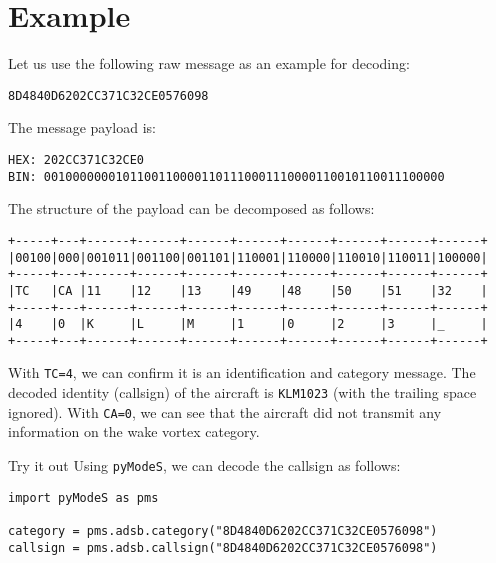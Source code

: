 \section{Example}

Let us use the following raw message as an example for decoding:

\begin{verbatim}
8D4840D6202CC371C32CE0576098
\end{verbatim}

The message payload is:

\begin{verbatim}
HEX: 202CC371C32CE0
BIN: 00100000001011001100001101110001110000110010110011100000
\end{verbatim}

The structure of the payload can be decomposed as follows:

\begin{verbatim}
+-----+---+------+------+------+------+------+------+------+------+
|00100|000|001011|001100|001101|110001|110000|110010|110011|100000|
+-----+---+------+------+------+------+------+------+------+------+
|TC   |CA |11    |12    |13    |49    |48    |50    |51    |32    |
+-----+---+------+------+------+------+------+------+------+------+
|4    |0  |K     |L     |M     |1     |0     |2     |3     |_     |
+-----+---+------+------+------+------+------+------+------+------+
\end{verbatim}

With \texttt{TC=4}, we can confirm it is an identification and category message. The decoded identity (callsign) of the aircraft is \texttt{KLM1023} (with the trailing space ignored). With \texttt{CA=0}, we can see that the aircraft did not transmit any information on the wake vortex category.

\begin{notebox}{Try it out}
Using \texttt{pyModeS}, we can decode the callsign as follows:

\begin{verbatim}
import pyModeS as pms

category = pms.adsb.category("8D4840D6202CC371C32CE0576098")
callsign = pms.adsb.callsign("8D4840D6202CC371C32CE0576098")
\end{verbatim}

\end{notebox}
 
  